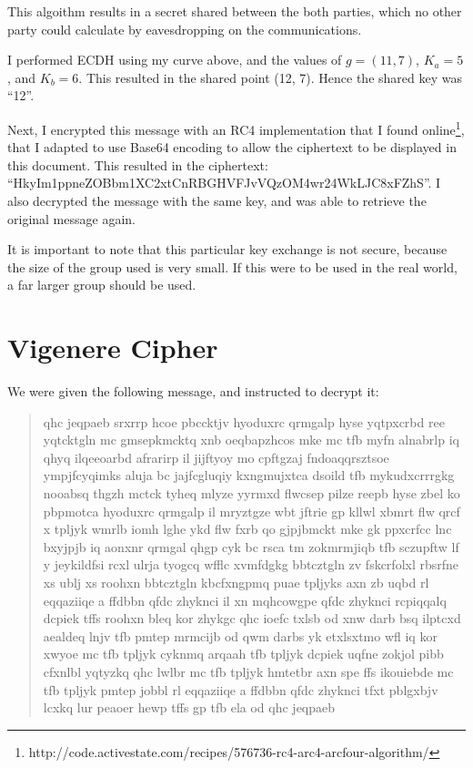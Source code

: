 \documentclass[11pt,a4paper,twoside]{article}
\begin{document}
This algoithm results in a secret shared between the both parties, which no
other party could calculate by eavesdropping on the communications. 

I performed ECDH using my curve above, and the values of $g = (11, 7)$, $K_{a}
= 5$, and  $K_{b} = 6$. This resulted in the shared point (12, 7). Hence the
shared key was ``12''. 

Next, I encrypted this message with an RC4 implementation that I found
online\footnote{http://code.activestate.com/recipes/576736-rc4-arc4-arcfour-algorithm/},
that I adapted to use Base64 encoding to allow the ciphertext to be displayed
in this document. This resulted  in the ciphertext:
``HkyIm1ppneZOBbm1XC2xtCnRBGHVFJvVQzOM4wr24WkLJC8xFZhS''. I also decrypted the
message with the same key, and was able to retrieve the original message again. 

It is important to note that this particular key exchange is not secure,
because the size of the group used is very small. If this were to be used in
the real world, a far larger group should be used. 

\vfill
\pagebreak
\section{Vigenere Cipher}
We were given the following message, and instructed to decrypt it:

\begin{quote}
\small
\raggedright
qhc jeqpaeb srxrrp hcoe pbccktjv hyoduxrc qrmgalp hyse yqtpxcrbd ree yqtcktgln
mc gmsepkmcktq xnb oeqbapzhcos mke mc tfb myfn alnabrlp iq qhyq ilqeeoarbd
afrarirp il jijftyoy mo cpftgzaj fndoaqqrsztsoe ympjfcyqimks aluja bc
jajfcgluqiy kxngmujxtca dsoild tfb mykudxcrrrgkg nooabsq thgzh mctck tyheq
mlyze yyrmxd flwcsep pilze reepb hyse zbel ko pbpmotca hyoduxrc qrmgalp il
mryztgze wbt jftrie gp kllwl xbmrt flw qrcf x tpljyk wmrlb iomh lghe ykd flw
fxrb qo gjpjbmckt mke gk ppxcrfcc lnc bxyjpjb iq aonxnr qrmgal qhgp cyk bc rsca
tm zokmrmjiqb tfb sczupftw lf y jeykildfsi rcxl ulrja tyogcq wfflc xvmfdgkg
bbtcztgln zv fskcrfolxl rbsrfne xs ublj xs roohxn bbtcztgln kbcfxngpmq puae
tpljyks axn zb uqbd rl eqqaziiqe a ffdbbn qfdc zhyknci il xn mqhcowgpe qfdc
zhyknci rcpiqqalq dcpiek tffs roohxn bleq kor zhykgc qhc ioefc txlsb od xnw
darb bsq ilptcxd aealdeq lnjv tfb pmtep mrmcijb od qwm darbs yk etxlsxtmo wfl
iq kor xwyoe mc tfb tpljyk cyknmq arqaah tfb tpljyk dcpiek uqfne zokjol pibb
cfxnlbl yqtyzkq qhc lwlbr mc tfb tpljyk hmtetbr axn spe ffs ikouiebde mc tfb
tpljyk pmtep jobbl rl eqqaziiqe a ffdbbn qfdc zhyknci tfxt pblgxbjv lcxkq lur
peaoer hewp tffs gp tfb ela od qhc jeqpaeb 
\end{quote}
\end{document}
